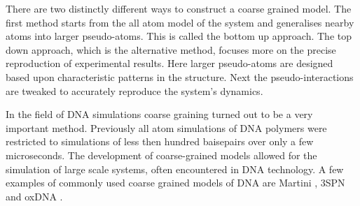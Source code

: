 There are two distinctly different ways to construct a coarse grained model. The first
method starts from the all atom model of the system and generalises nearby atoms into
larger pseudo-atoms. This is called the bottom up approach. The top down approach, which
is the alternative method, focuses more on the precise reproduction of experimental
results. Here larger pseudo-atoms are designed based upon characteristic patterns in the
structure. Next the pseudo-interactions are tweaked to accurately reproduce the
system's dynamics.

In the field of DNA simulations coarse graining turned out to be a very important
method. Previously all atom simulations of DNA polymers were restricted to simulations of
less then hundred baisepairs over only a few microseconds. The development of
coarse-grained models allowed for the simulation of large scale systems, often
encountered in DNA technology. A few examples of commonly used coarse grained models of
DNA are Martini \cite{Souza2021}, 3SPN \cite{Freeman2011} and oxDNA
\cite{Ouldridge2010}.\\

